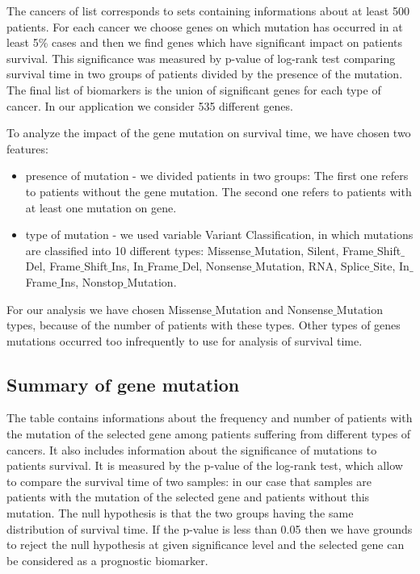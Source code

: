 The cancers of list corresponds to sets containing informations about at
least 500 patients. For each cancer we choose genes on which mutation
has occurred in at least 5\% cases and then we find genes which have
significant impact on patients survival. This significance was measured
by p-value of log-rank test comparing survival time in two groups of
patients divided by the presence of the mutation. The final list of
biomarkers is the union of significant genes for each type of cancer. In
our application we consider 535 different genes.

To analyze the impact of the gene mutation on survival time, we have
chosen two features:

\begin{itemize}
\itemsep1pt\parskip0pt
\item
  presence of mutation - we divided patients in two groups: The first
  one refers to patients without the gene mutation. The second one
  refers to patients with at least one mutation on gene.
\item
  type of mutation - we used variable Variant Classification, in which
  mutations are classified into 10 different types:
  Missense\(\_\)Mutation, Silent, Frame\(\_\)Shift\(\_\)Del,
  Frame\(\_\)Shift\(\_\)Ins, In\(\_\)Frame\(\_\)Del,
  Nonsense\(\_\)Mutation, RNA, Splice\(\_\)Site, In\(\_\)Frame\(\_\)Ins,
  Nonstop\(\_\)Mutation.
\end{itemize}

For our analysis we have chosen Missense\(\_\)Mutation and
Nonsense\(\_\)Mutation types, because of the number of patients with
these types. Other types of genes mutations occurred too infrequently to
use for analysis of survival time.

\subsection{Summary of gene mutation}\label{summary-of-gene-mutation}

The table contains informations about the frequency and number of
patients with the mutation of the selected gene among patients suffering
from different types of cancers. It also includes information about the
significance of mutations to patients survival. It is measured by the
p-value of the log-rank test, which allow to compare the survival time
of two samples: in our case that samples are patients with the mutation
of the selected gene and patients without this mutation. The null
hypothesis is that the two groups having the same distribution of
survival time. If the p-value is less than 0.05 then we have grounds to
reject the null hypothesis at given significance level and the selected
gene can be considered as a prognostic biomarker.


